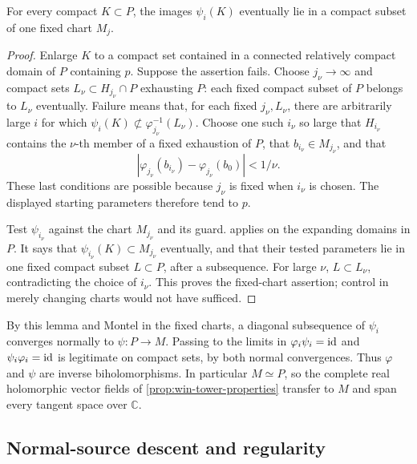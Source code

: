 \begin{lemma}\label{lem:quo-inverse-tightness}
For every compact $K\subset P$, the images $\psi_i(K)$ eventually lie in a compact subset of one fixed chart $M_j$.
\end{lemma}
\begin{proof}
Enlarge $K$ to a compact set contained in a connected relatively compact domain of $P$ containing $p$. Suppose the assertion fails. Choose $j_\nu\to\infty$ and compact sets $L_\nu\subset H_{j_\nu}\cap P$ exhausting $P$: each fixed compact subset of $P$ belongs to $L_\nu$ eventually. Failure means that, for each fixed $j_\nu,L_\nu$, there are arbitrarily large $i$ for which $\psi_i(K)\not\subset\varphi_{j_\nu}^{-1}(L_\nu)$. Choose one such $i_\nu$ so large that $H_{i_\nu}$ contains the $\nu$-th member of a fixed exhaustion of $P$, that $b_{i_\nu}\in M_{j_\nu}$, and that
\[
 |\varphi_{j_\nu}(b_{i_\nu})-
   \varphi_{j_\nu}(b_0)|<1/\nu.
\]
These last conditions are possible because $j_\nu$ is fixed when $i_\nu$ is chosen. The displayed starting parameters therefore tend to $p$.

Test $\psi_{i_\nu}$ against the chart $M_{j_\nu}$ and its guard.  applies on the expanding domains in $P$. It says that $\psi_{i_\nu}(K)\subset M_{j_\nu}$ eventually, and that their tested parameters lie in one fixed compact subset $L\subset P$, after a subsequence. For large $\nu$, $L\subset L_\nu$, contradicting the choice of $i_\nu$. This proves the fixed-chart assertion; control in merely changing charts would not have sufficed.
\end{proof}

By this lemma and Montel in the fixed charts, a diagonal subsequence of $\psi_i$ converges normally to $\psi:P\to M$. Passing to the limits in $\varphi_i\psi_i=\operatorname{id}$ and $\psi_i\varphi_i=\operatorname{id}$ is legitimate on compact sets, by both normal convergences. Thus $\varphi$ and $\psi$ are inverse biholomorphisms. In particular $M\simeq P$, so the complete real holomorphic vector fields of \cref{prop:win-tower-properties} transfer to $M$ and span every tangent space over $\mathbb{C}$.

\subsection{Normal-source descent and regularity}

